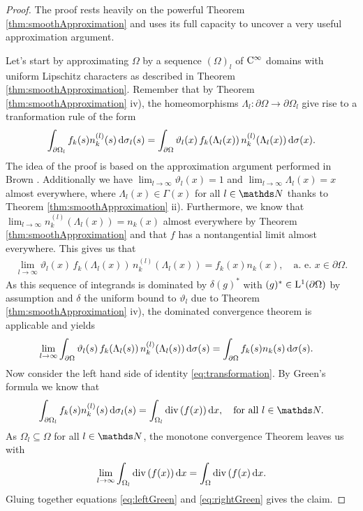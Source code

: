 \begin{proof}
  The proof rests heavily on the powerful Theorem \ref{thm:smoothApproximation} and uses its full capacity to uncover a very useful approximation argument.

  Let's start by approximating $\Omega$ by a sequence $(\Omega)_l$ of $\mathrm{C}^\infty$ domains with uniform Lipschitz characters as described in Theorem \ref{thm:smoothApproximation}. 
  Remember that by Theorem \ref{thm:smoothApproximation} iv), the homeomorphisms $\Lambda_l \colon \partial\Omega \to \partial\Omega_l$ give rise to a tranformation rule of the form 
  \begin{align}
    \label{eq:transformation}
    \int_{\partial\Omega_l} f_k(s) n_k^{(l)}(s) \, {\operatorname{d}\!{\sigma}}_l(s)
    = \int_{\partial\Omega} \vartheta_l(x) \, f_k(\Lambda_l(x)) \, n_k^{(l)}(\Lambda_l(x)) \, {\operatorname{d}\!{\sigma}}(x).
  \end{align}
  The idea of the proof is based on the approximation argument performed in Brown \cite[Prop. 2.4]{brown}. 
  Additionally we have $\lim_{l \to \infty} \vartheta_l(x) = 1$ and $\lim_{l \to \infty} \Lambda_l(x) = x$ almost everywhere, where $\Lambda_l(x) \in \Gamma(x)$ for all $l \in \N$ thanks to Theorem \ref{thm:smoothApproximation} ii).
  Furthermore, we know that $\lim_{l \to \infty} n_k^{(l)}(\Lambda_l(x)) = n_k(x)$ almost everywhere by Theorem \ref{thm:smoothApproximation} and that $f$ has a nontangential limit almost everywhere.
  This gives us that 
  \begin{align*}
    \lim_{l \to \infty} \vartheta_l(x) \, f_k(\Lambda_l(x)) \, n_k^{(l)}(\Lambda_l(x)) = f_k(x) n_k(x), \quad\text{a. e. } x \in \partial\Omega.
  \end{align*}
  As this sequence of integrands is dominated by $\delta (g)^*$ with $(g)^* \in \mathrm{L}^1(\partial\Omega)$ by assumption and $\delta$ the uniform bound to $\vartheta_l$ due to Theorem \ref{thm:smoothApproximation} iv), the dominated convergence theorem is applicable and yields
  \begin{align}
    \label{eq:leftGreen}
    \lim_{l \to \infty} \int_{\partial \Omega} \vartheta_l(s) \, f_k(\Lambda_l(s))\,  n_k^{(l)}(\Lambda_l(s))\, {\operatorname{d}\!{\sigma}}(s)
    &= 
    \int_{\partial\Omega} f_k(s) n_k(s) \, {\operatorname{d}\!{\sigma}}(s).
  \end{align}
  Now consider the left hand side of identity \eqref{eq:transformation}.
  By Green's formula \cite[p. 711f.]{evans} we know that
  \begin{align*}
    \int_{\partial\Omega_l} f_k(s) n_k^{(l)}(s) \d\sigma_l(s)
    = \int_{\Omega_l} \div(f(x)) \d x, \quad\text{for all } l \in \N.
  \end{align*}
  As $\Omega_l \subseteq \Omega$ for all $l \in \N$, the monotone convergence Theorem leaves us with
  \begin{align}
    \label{eq:rightGreen}
    \lim_{l \to \infty} \int_{\Omega_l} \mathrm{div\,} (f(x)) \, {\operatorname{d}\!{x}} = \int_\Omega \mathrm{div\,} (f(x) \, {\operatorname{d}\!{x}}.
  \end{align}
  Gluing together equations \eqref{eq:leftGreen} and \eqref{eq:rightGreen} gives the claim.
\end{proof}


